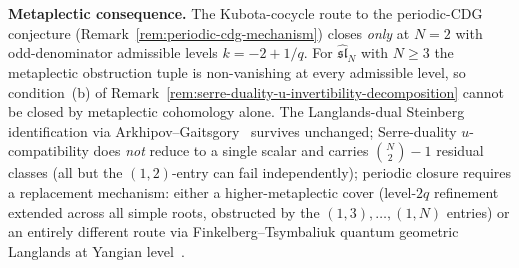 \begin{proposition}
\medskip
\noindent\textbf{Metaplectic consequence.}
The Kubota-cocycle route to the periodic-CDG conjecture (Remark~\ref{rem:periodic-cdg-mechanism}) closes
\emph{only} at $N=2$ with odd-denominator admissible levels
$k=-2+1/q$. For $\widehat{\mathfrak{sl}}_N$ with $N\geq 3$ the
metaplectic obstruction tuple is non-vanishing at every admissible
level, so condition~(b) of
Remark~\ref{rem:serre-duality-u-invertibility-decomposition} cannot
be closed by metaplectic cohomology alone. The Langlands-dual
Steinberg identification via Arkhipov--Gaitsgory~\cite{ArkhipovGaitsgory09}
survives unchanged; Serre-duality $u$-compatibility does \emph{not} reduce to a
single scalar and carries $\binom{N}{2}-1$ residual classes (all
but the $(1,2)$-entry can fail independently); periodic closure
requires a replacement mechanism: either a higher-metaplectic
cover (level-$2q$ refinement extended across all simple roots,
obstructed by the $(1,3),\ldots,(1,N)$ entries) or an entirely
different route via Finkelberg--Tsymbaliuk quantum geometric
Langlands at Yangian level~\cite{FinkelbergTsymbaliuk19}.
\end{proposition}

